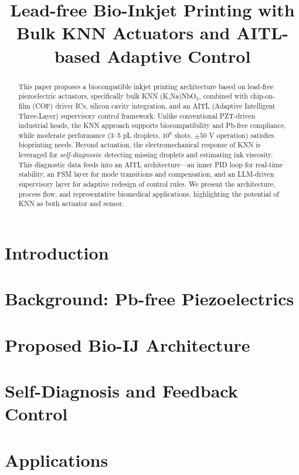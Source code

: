 \documentclass[conference]{IEEEtran}
\title{Lead-free Bio-Inkjet Printing with Bulk KNN Actuators and AITL-based Adaptive Control}
\author{
  \IEEEauthorblockN{Shinichi Samizo}
  \IEEEauthorblockA{Independent Semiconductor Researcher\\
  Former Engineer at Seiko Epson Corporation\\
  Email: \href{mailto:shin3t72@gmail.com}{shin3t72@gmail.com}\\
  GitHub: \url{https://github.com/Samizo-AITL}}
}
\begin{document}
\maketitle

\begin{abstract}
This paper proposes a biocompatible inkjet printing architecture based on
lead-free piezoelectric actuators, specifically bulk KNN (K,Na)NbO$_3$, combined
with chip-on-film (COF) driver ICs, silicon cavity integration, and
an AITL (Adaptive Intelligent Three-Layer) supervisory control framework.
Unlike conventional PZT-driven industrial heads, the KNN approach supports
biocompatibility and Pb-free compliance, while moderate performance
(3--5 pL droplets, $10^6$ shots, $\pm50$ V operation) satisfies bioprinting needs.
Beyond actuation, the electromechanical response of KNN is leveraged for
\emph{self-diagnosis}: detecting missing droplets and estimating ink viscosity.
This diagnostic data feeds into an AITL architecture---an inner PID loop for
real-time stability, an FSM layer for mode transitions and compensation,
and an LLM-driven supervisory layer for adaptive redesign of control rules.
We present the architecture, process flow, and representative biomedical
applications, highlighting the potential of KNN as both actuator and sensor.
\end{abstract}

\section{Introduction}


\section{Background: Pb-free Piezoelectrics}


\section{Proposed Bio-IJ Architecture}


\section{Self-Diagnosis and Feedback Control}


\section{Applications}

\end{document}
